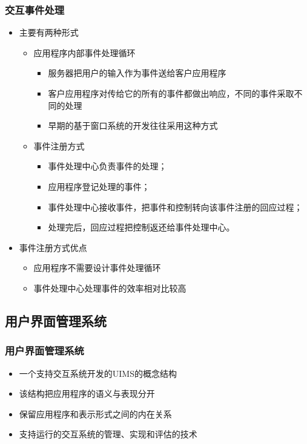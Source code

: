 \documentclass{beamer}
\begin{document}
\begin{frame}
	\frametitle{交互事件处理}
	\beamertemplatetransparentcovereddynamicmedium
	\begin{itemize}
		\item 主要有两种形式
		\pause
		\begin{itemize}
			\item 应用程序内部事件处理循环
			\begin{itemize}
				\item 服务器把用户的输入作为事件送给客户应用程序
				\item 客户应用程序对传给它的所有的事件都做出响应，不同的事件采取不同的处理
				\item 早期的基于窗口系统的开发往往采用这种方式
			\end{itemize}
			\pause
			\item 事件注册方式
			\begin{itemize}
				\item 事件处理中心负责事件的处理；
				\item 应用程序登记处理的事件；
				\item 事件处理中心接收事件，把事件和控制转向该事件注册的回应过程；
				\item 处理完后，回应过程把控制返还给事件处理中心。
			\end{itemize}
		\end{itemize}
		\pause
		\item 事件注册方式优点
		\begin{itemize}
			\item 应用程序不需要设计事件处理循环
			\item 事件处理中心处理事件的效率相对比较高
		\end{itemize}
	\end{itemize}
\end{frame}

%
%
%
%
%

\subsection{用户界面管理系统}
\begin{frame}
	\frametitle{用户界面管理系统}
	\beamertemplatetransparentcovereddynamicmedium
	\begin{itemize}[<+->]
		\item 一个支持交互系统开发的UIMS的概念结构
		\item 该结构把应用程序的语义与表现分开
		\item 保留应用程序和表示形式之间的内在关系
		\item 支持运行的交互系统的管理、实现和评估的技术
	\end{itemize}
\end{frame}
\end{document}
